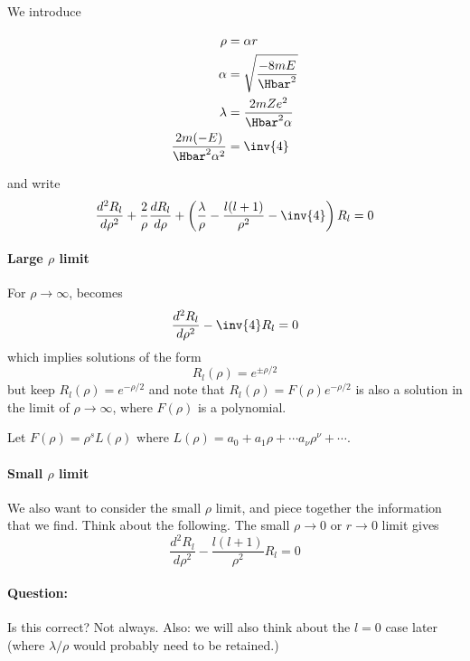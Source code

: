 We introduce

\begin{align}\label{eqn:PHY356FLecture10:100}
\rho &= \alpha r \\
\alpha &= \sqrt{\frac{-8 m E}{\Hbar^2}} \\
\lambda &= \frac{2 m Z e^2}{\Hbar^2 \alpha} \\
\frac{2 m (- E) }{\Hbar^2 \alpha^2 } &= \inv{4}
\end{align}

and write
\begin{equation}\label{eqn:PHY356FLecture10:110}
\frac{d^2 R_l}{d\rho^2} + \frac{2}{\rho} \frac{d R_l}{d\rho} + \left( \frac{\lambda}{\rho} - \frac{l(l+1)}{\rho^2} - \inv{4} \right) R_l = 0
\end{equation}
%
\paragraph{Large \(\rho\) limit}
%
For \(\rho \rightarrow \infty\),  becomes
\begin{equation}\label{eqn:PHY356FLecture10:120}
\frac{d^2 R_l}{d\rho^2} - \inv{4} R_l = 0
\end{equation}
%
which implies solutions of the form
\begin{equation}\label{eqn:PHY356FLecture10:130}
R_l(\rho) = e^{\pm \rho/2}
\end{equation}
%
but keep \(R_l(\rho) = e^{-\rho/2}\) and note that \(R_l(\rho) = F(\rho)e^{-\rho/2}\) is also a solution in the limit of \(\rho \rightarrow \infty\), where \(F(\rho)\) is a polynomial.

Let \(F(\rho) = \rho^s L(\rho)\) where \(L(\rho) = a_0 + a_1 \rho + \cdots a_\nu \rho^\nu + \cdots\).
%
\paragraph{Small \(\rho\) limit}
%
We also want to consider the small \(\rho\) limit, and piece together the information that we find.  Think about the following.  The small \(\rho \rightarrow 0\) or \(r \rightarrow 0\) limit gives
%
\begin{equation}\label{eqn:PHY356FLecture10:140}
\frac{d^2 R_l}{d\rho^2} - \frac{l(l+1)}{\rho^2} R_l = 0
\end{equation}
%
\paragraph{Question:} Is this correct?
%
Not always.  Also: we will also think about the \(l=0\) case later (where \(\lambda/\rho\) would probably need to be retained.)

